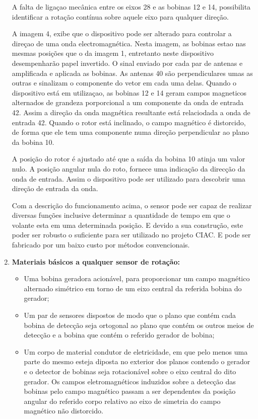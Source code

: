 \begin{enumerate}
  A falta de ligaçao mecânica entre os eixos 28 e as bobinas 12 e 14, possibilita identificar a rotação contínua sobre aquele eixo para qualquer direção.

  A imagem 4, exibe que o dispositivo pode ser alterado para controlar a direçao de uma onda electromagnética. Nesta imagem, as bobinas estao nas mesmas posições que o da imagem 1, entretanto neste dispositivo desempenharão papel invertido. O sinal enviado por cada par de antenas e amplificada e aplicada as bobinas. As antenas 40 são perpendiculares umas as outras e sinalizam o componente do vetor em cada uma delas. Quando o dispositivo está em utilizaçao, as bobinas 12 e 14 geram campos magneticos alternados de grandeza porporcional a um componente da onda de entrada 42. Assim a direção da onda magnética resultante está relaciodada a onda de entrada 42. Quando o rotor está inclinado, o campo magnético é distorcido, de forma que ele tem uma componente numa direção perpendicular ao plano da bobina 10.

  A posição do rotor é ajustado até que a saída da bobina 10 atinja um valor nulo. A posição angular nula do roto, fornece uma indicação da direcção da onda de entrada. Assim o dispositivo pode ser utilizado para descobrir uma direção de entrada da onda.

  Com a descrição do funcionamento acima, o sensor pode ser capaz de realizar diversas funções inclusive determinar a quantidade de tempo em que o volante esta em uma determinada posição. E devido a sua construção, este poder ser robusto o suficiente para ser utilizado no projeto CIAC. E pode ser fabricado por um baixo custo por métodos convencionais.

  \item \textbf{Materiais básicos a qualquer sensor de rotação:}
  \begin{itemize}
    \item Uma bobina geradora acionável, para proporcionar um campo magnético alternado simétrico em torno de um eixo central da referida bobina do gerador;

    \item Um par de sensores dispostos de modo que o plano que contém cada bobina de detecção seja ortogonal ao plano que contém os outros meios de detecção e a bobina que contém o referido gerador de bobina;

    \item Um corpo de material condutor de eletricidade, em que pelo menos uma parte do mesmo esteja diposta no exterior dos planos contendo o gerador e o detector de bobinas seja rotacionável sobre o eixo central do dito gerador. Os campos eletromagnéticos induzidos sobre a detecção das bobinas pelo campo magnético passam a ser dependentes da posição angular do referido corpo relativo ao eixo de simetria do campo magnético não distorcido.


\end{itemize}
\end{enumerate}
